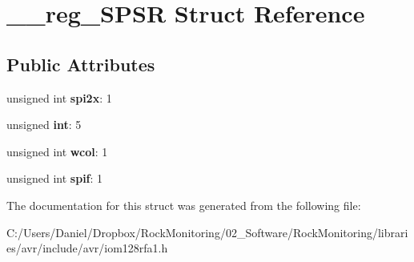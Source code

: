 \hypertarget{struct____reg___s_p_s_r}{}\section{\+\_\+\+\_\+reg\+\_\+\+S\+P\+SR Struct Reference}
\label{struct____reg___s_p_s_r}
\subsection*{Public Attributes}
\begin{DoxyCompactItemize}
\item 
unsigned int {\bfseries spi2x}\+: 1\hypertarget{struct____reg___s_p_s_r_a46ffde867698c969b7b4a2d3f7eca720}{}\label{struct____reg___s_p_s_r_a46ffde867698c969b7b4a2d3f7eca720}

\item 
unsigned {\bfseries int}\+: 5\hypertarget{struct____reg___s_p_s_r_a1a7cda93d94068c29ddcb4ced987e307}{}\label{struct____reg___s_p_s_r_a1a7cda93d94068c29ddcb4ced987e307}

\item 
unsigned int {\bfseries wcol}\+: 1\hypertarget{struct____reg___s_p_s_r_a7520ffe5e939a5aca8c05c0590b6ee66}{}\label{struct____reg___s_p_s_r_a7520ffe5e939a5aca8c05c0590b6ee66}

\item 
unsigned int {\bfseries spif}\+: 1\hypertarget{struct____reg___s_p_s_r_a660f006d61537598c7eea11e55853077}{}\label{struct____reg___s_p_s_r_a660f006d61537598c7eea11e55853077}

\end{DoxyCompactItemize}


The documentation for this struct was generated from the following file\+:\begin{DoxyCompactItemize}
\item 
C\+:/\+Users/\+Daniel/\+Dropbox/\+Rock\+Monitoring/02\+\_\+\+Software/\+Rock\+Monitoring/libraries/avr/include/avr/iom128rfa1.\+h\end{DoxyCompactItemize}
